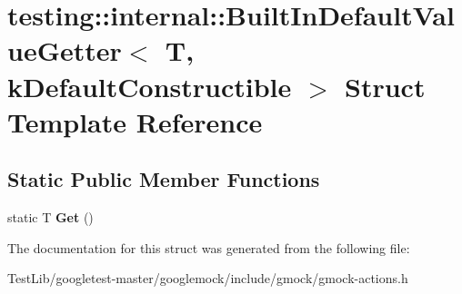 \hypertarget{structtesting_1_1internal_1_1BuiltInDefaultValueGetter}{}\section{testing\+:\+:internal\+:\+:Built\+In\+Default\+Value\+Getter$<$ T, k\+Default\+Constructible $>$ Struct Template Reference}
\label{structtesting_1_1internal_1_1BuiltInDefaultValueGetter}
\subsection*{Static Public Member Functions}
\begin{DoxyCompactItemize}
\item 
\mbox{\label{structtesting_1_1internal_1_1BuiltInDefaultValueGetter_a61c47c50cdb6ab488dabe2cec3b97fc8}} 
static T {\bfseries Get} ()
\end{DoxyCompactItemize}


The documentation for this struct was generated from the following file\+:\begin{DoxyCompactItemize}
\item 
Test\+Lib/googletest-\/master/googlemock/include/gmock/gmock-\/actions.\+h\end{DoxyCompactItemize}
